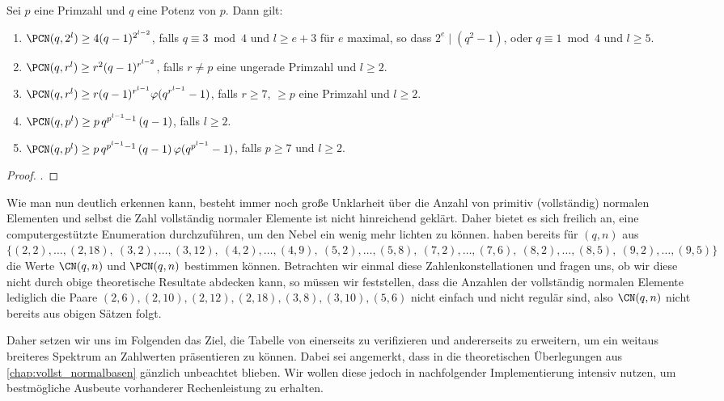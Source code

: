 \begin{satz}
  Sei $p$ eine Primzahl und $q$ eine Potenz von $p$. Dann gilt:
  \begin{enumerate}
    \item $\PCN(q,2^l) \geq 4(q-1)^{2^{l-2}}$, falls $q\equiv 3 \bmod 4$
      und $l\geq e+3$ für $e$ maximal, so dass $2^e\mid (q^2-1)$, oder
      $q\equiv 1\bmod 4$ und $l\geq 5$.
    \item $\PCN(q,r^l) \geq r^2(q-1)^{r^{l-2}}$, falls
      $r\neq p$ eine ungerade Primzahl und $l\geq 2$.
    \item $\PCN(q,r^l) \geq r(q-1)^{r^{l-1}}\varphi(q^{r^{l-1}}-1)$, falls
      $r\geq 7$, $\geq p$ eine Primzahl und $l\geq 2$.
    \item $\PCN(q,p^l) \geq p\,q^{p^{l-1}-1}\,(q-1)$, falls $l\geq 2$.
    \item $\PCN(q,p^l)\geq p\,q^{p^{l-1}-1}\,(q-1)\,\varphi(q^{p^{l-1}}-1)$,
      falls $p\geq 7$ und $l\geq 2$.
  \end{enumerate}
\end{satz}
\begin{proof}
  \autocite{hachenberger2010}.
\end{proof}

Wie man nun deutlich erkennen kann, besteht immer noch große Unklarheit über
die Anzahl von primitiv (vollständig) normalen Elementen und selbst die Zahl
vollständig normaler Elemente ist nicht hinreichend geklärt. Daher bietet es
sich freilich an, eine computergestützte Enumeration durchzuführen, um den
Nebel ein wenig mehr lichten zu können. 
\citeauthor{morgan1996} \autocite{morgan1996} haben bereits 
\citeyear{morgan1996} für $(q,n)$ aus 
$\{ (2,2),\ldots,(2,18),\allowbreak\ 
  (3,2),\ldots,(3,12),\allowbreak\ 
  (4,2),\ldots,(4,9),\allowbreak\ 
  (5,2),\ldots,(5,8),\allowbreak\ 
  (7,2),\ldots,(7,6),\allowbreak\ 
  (8,2),\ldots,(8,5),\allowbreak\ 
  (9,2),\ldots,(9,5)\}$ die Werte $\CN(q,n)$ und $\PCN(q,n)$ bestimmen können.
Betrachten wir einmal diese Zahlenkonstellationen und fragen uns, ob wir diese
nicht durch obige theoretische Resultate abdecken kann, so müssen wir
feststellen, dass die Anzahlen der vollständig normalen Elemente lediglich
die Paare $(2,6), (2,10),(2,12),(2,18), (3,8), (3,10), (5,6)$ nicht einfach und
nicht regulär sind, also $\CN(q,n)$ nicht bereits aus obigen Sätzen
folgt.

Daher setzen wir uns im Folgenden das Ziel, die Tabelle von 
\citeauthor{morgan1996} einerseits zu verifizieren und andererseits zu
erweitern, um ein weitaus breiteres Spektrum an Zahlwerten präsentieren zu
können. Dabei sei angemerkt, dass in \autocite{morgan1996} die theoretischen
Überlegungen aus \autoref{chap:vollst_normalbasen} gänzlich unbeachtet blieben.
Wir wollen diese jedoch in nachfolgender Implementierung intensiv nutzen, um
bestmögliche Ausbeute vorhanderer Rechenleistung zu erhalten.
